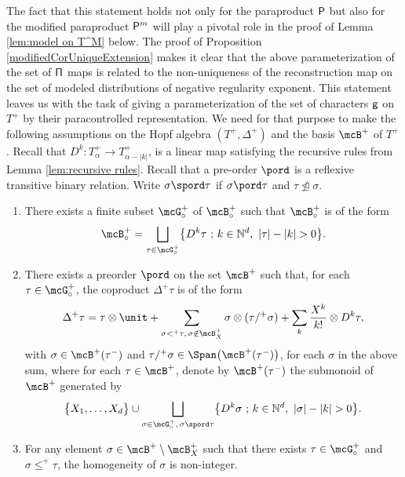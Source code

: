 The fact that this statement holds not only for the paraproduct $\sf P$ but also for the modified paraproduct ${\sf P}^m$ will play a pivotal role in the proof of Lemma \ref{lem:model on T^M} below. The proof of Proposition \ref{modifiedCorUniqueExtension} makes it clear that the above parameterization of the set of $\sf \Pi$ maps is related to the non-uniqueness of the reconstruction map on the set of modeled distributions of negative regularity exponent. This statement leaves us with the task of giving a parameterization of the set of characters $\sf g$ on $T^+$ by their paracontrolled representation. We need for that purpose to make the following assumptions on the Hopf algebra $(T^+,\Delta^+)$ and the basis $\mcB^+$ of $T^+$. Recall that $D^k:T_\alpha^+\to T_{\alpha-|k|}^+$, is a linear map satisfying the recursive rules from Lemma \ref{lem:recursive rules}. Recall that a pre-order $\pord$ is a reflexive transitive binary relation. Write $\sigma\spord\tau$ if $\sigma\pord\tau$ and $\tau\ntrianglelefteq\sigma$.

\skpt
\begin{assumption}\label{ass:C}
\begin{enumerate}
\item\label{ass:C1}
There exists a finite subset $\mcG_\circ^+$ of $\mcB_\circ^+$ such that $\mcB_\circ^+$ is of the form
\[
\mcB_\circ^+ = \bigsqcup_{\tau\in\mcG_\circ^+} \bigl\{D^k\tau\ ;\, k\in\mathbb{N}^d,\ |\tau|-|k|>0\bigr\}.
\]
	\item\label{ass:C2}
	There exists a preorder $\pord$ on the set $\mcB^+$ such that, for each $\tau\in\mcG_\circ^+$,
	the coproduct $\Delta^+\tau$ is of the form
\begin{align}\label{eq:canonical coproduct}
\Delta^+\tau=\tau\otimes\unit+\sum_{\sigma<^+\tau,\, \sigma\notin\mcB_X^+}\sigma\otimes(\tau/^+\sigma) + \sum_{k}\frac{X^{k}}{k!}\otimes D^k\tau,
\end{align}
with $\sigma\in\mcB^+(\tau^-)$ and $\tau/^+\sigma\in\Span\bigl(\mcB^+(\tau^-)\bigr)$, for each $\sigma$ in the above sum,
where for each $\tau\in\mcB^+$, denote by $\mcB^+(\tau^-)$ the submonoid of $\mcB^+$ generated by
\[
\big\{X_1,\dots,X_d\big\}\cup\bigsqcup_{\sigma\in\mcG_\circ^+,\, \sigma\spord\tau} \bigl\{D^k\sigma\ ;\, k\in\mathbb{N}^d,\ |\sigma|-|k|>0\bigr\}.
\]

\item\label{ass:C3}
For any element $\sigma\in\mcB^+\setminus\mcB_X^+$ such that there exists $\tau\in\mcG_\circ^+$ and $\sigma\le^+\tau$, the homogeneity of $\sigma$ is non-integer.
\end{enumerate}
\end{assumption}

